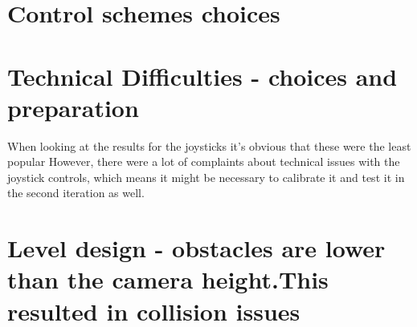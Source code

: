 \section{Control schemes choices}
\section{Technical Difficulties - choices and preparation} 
When looking at the results for the joysticks it’s obvious that these were the least popular
However, there were a lot of complaints about technical issues with the joystick controls, which means it might be necessary to calibrate it and test it in the second iteration as well. 
\section{Level design - obstacles are lower than the camera height.This resulted in collision issues }
